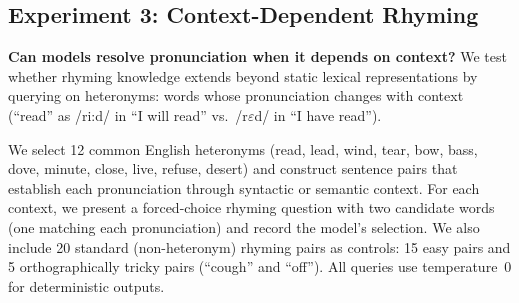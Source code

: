 \subsection{Experiment 3: Context-Dependent Rhyming}
\label{sec:method_context}

{\bf Can models resolve pronunciation when it depends on context?}
We test whether rhyming knowledge extends beyond static lexical representations by querying \gptfour on heteronyms: words whose pronunciation changes with context (\eg ``read'' as /ri:d/ in ``I will read'' vs.\ /r$\varepsilon$d/ in ``I have read'').

We select 12 common English heteronyms (read, lead, wind, tear, bow, bass, dove, minute, close, live, refuse, desert) and construct sentence pairs that establish each pronunciation through syntactic or semantic context.
For each context, we present a forced-choice rhyming question with two candidate words (one matching each pronunciation) and record the model's selection.
We also include 20 standard (non-heteronym) rhyming pairs as controls: 15 easy pairs and 5 orthographically tricky pairs (\eg ``cough'' and ``off'').
All queries use temperature~0 for deterministic outputs.
